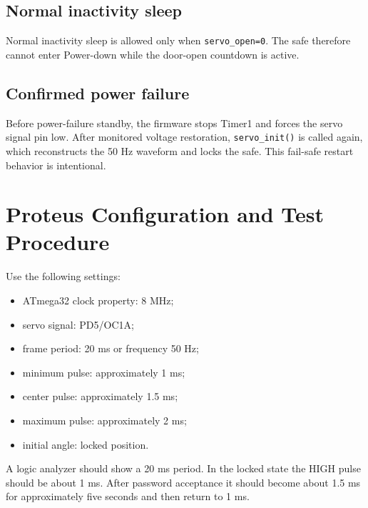 \documentclass[11pt,a4paper]{article}
\begin{document}
\subsection{Normal inactivity sleep}
Normal inactivity sleep is allowed only when \texttt{servo\_open=0}. The safe therefore cannot enter Power-down while the door-open countdown is active.

\subsection{Confirmed power failure}
Before power-failure standby, the firmware stops Timer1 and forces the servo signal pin low. After monitored voltage restoration, \texttt{servo\_init()} is called again, which reconstructs the 50 Hz waveform and locks the safe. This fail-safe restart behavior is intentional.

\section{Proteus Configuration and Test Procedure}
Use the following settings:
\begin{itemize}
  \item ATmega32 clock property: 8 MHz;
  \item servo signal: PD5/OC1A;
  \item frame period: 20 ms or frequency 50 Hz;
  \item minimum pulse: approximately 1 ms;
  \item center pulse: approximately 1.5 ms;
  \item maximum pulse: approximately 2 ms;
  \item initial angle: locked position.
\end{itemize}

A logic analyzer should show a 20 ms period. In the locked state the HIGH pulse should be about 1 ms. After password acceptance it should become about 1.5 ms for approximately five seconds and then return to 1 ms.
\end{document}

